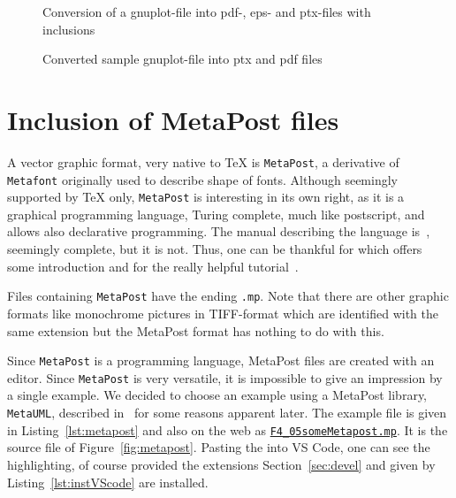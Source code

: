 \begin{figure}[htb]
\centering
{}
\caption{\label{fig:gp2pdf}Conversion of a gnuplot-file 
into pdf-, eps- and ptx-files with inclusions}
\end{figure}

\begin{figure}[htb]
\centering
{}
\caption{\label{fig:gnuplot}
Converted sample gnuplot-file into ptx and pdf files }
\end{figure}


\section{Inclusion of MetaPost files}\label{sec:metapost}

A vector graphic format, very native to TeX is \texttt{MetaPost}, 
a derivative of \texttt{Metafont} originally used to describe shape of fonts. 
Although seemingly supported by \TeX{} only, 
\texttt{MetaPost} is interesting in its own right, 
as it is a graphical programming language, 
Turing complete, much like postscript, and allows also declarative programming. 
The manual describing the language is~\cite{MPost}, 
seemingly complete, but it is not. 
Thus, one can be thankful for \cite{MPostGuid} 
which offers some introduction and for the really helpful tutorial~\cite{MPostTut}. 

Files containing \texttt{MetaPost} have the ending \texttt{.mp}. 
Note that there are other graphic formats 
like monochrome pictures in TIFF-format 
which are identified with the same extension 
but the MetaPost format has nothing to do with this. 

Since \texttt{MetaPost} is a programming language, 
MetaPost files are created with an editor. 
Since \texttt{MetaPost} is very versatile, 
it is impossible to give an impression by a single example. 
We decided to choose an example 
using a MetaPost library, \texttt{MetaUML}, 
described in~\cite{MetaUml} for some reasons apparent later. 
The example file is given in Listing~\ref{lst:metapost} 
and also on the web as 
\href{\urlSite fromTex/F4_05someMetapost.mp}{\texttt{F4\_05someMetapost.mp}}. 
It is the source file of Figure~\ref{fig:metapost}. 
Pasting the into VS Code, one can see the highlighting, 
of course provided the extensions Section~\ref{sec:devel} 
and given by Listing~\ref{lst:instVScode} are installed. 


